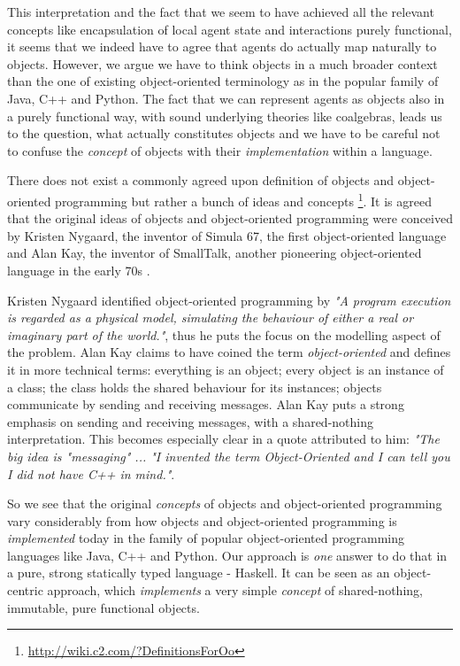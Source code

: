 \medskip

This interpretation and the fact that we seem to have achieved all the relevant concepts like encapsulation of local agent state and interactions purely functional, it seems that we indeed have to agree that agents do actually map naturally to objects. However, we argue we have to think objects in a much broader context than the one of existing object-oriented terminology as in the popular family of Java, C++ and Python. The fact that we can represent agents as objects also in a purely functional way, with sound underlying theories like coalgebras, leads us to the question, what actually constitutes objects and we have to be careful not to confuse the \textit{concept} of objects with their \textit{implementation} within a language.

There does not exist a commonly agreed upon definition of objects and object-oriented programming but rather a bunch of ideas and concepts \footnote{\url{http://wiki.c2.com/?DefinitionsForOo}}. It is agreed that the original ideas of objects and object-oriented programming were conceived by Kristen Nygaard, the inventor of Simula 67, the first object-oriented language \cite{dahl_birth_2002} and Alan Kay, the inventor of SmallTalk, another pioneering object-oriented language in the early 70s \cite{kay_early_1993}. %

Kristen Nygaard identified object-oriented programming by \textit{"A program execution is regarded as a physical model, simulating the behaviour of either a real or imaginary part of the world."}, thus he puts the focus on the modelling aspect of the problem. Alan Kay claims to have coined the term \textit{object-oriented} and defines it in more technical terms: everything is an object; every object is an instance of a class; the class holds the shared behaviour for its instances; objects communicate by sending and receiving messages. Alan Kay puts a strong emphasis on sending and receiving messages, with a shared-nothing interpretation. This becomes especially clear in a quote attributed to him: \textit{"The big idea is "messaging" ... "I invented the term Object-Oriented and I can tell you I did not have C++ in mind."}.

\medskip

So we see that the original \textit{concepts} of objects and object-oriented programming vary considerably from how objects and object-oriented programming is \textit{implemented} today in the family of popular object-oriented programming languages like Java, C++ and Python. %
Our approach is \textit{one} answer to do that in a pure, strong statically typed language - Haskell. It can be seen as an object-centric approach, which \textit{implements} a very simple \textit{concept} of shared-nothing, immutable, pure functional objects.


